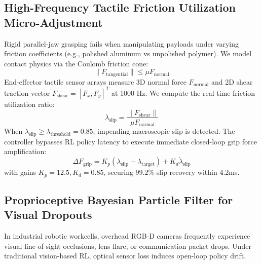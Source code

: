 \documentclass[10pt,twocolumn,a4paper]{article}
\begin{document}
\subsection{High-Frequency Tactile Friction Utilization Micro-Adjustment}
Rigid parallel-jaw grasping fails when manipulating payloads under varying friction coefficients (e.g., polished aluminum vs unpolished polymer). We model contact physics via the Coulomb friction cone:
\begin{equation}
  \|F_{\text{tangential}}\| \le \mu F_{\text{normal}}
  \label{eq:coulomb}
\end{equation}
End-effector tactile sensor arrays measure 3D normal force $F_{\text{normal}}$ and 2D shear traction vector $F_{\text{shear}} = [F_x, F_y]^T$ at 1000 Hz. We compute the real-time friction utilization ratio:
\begin{equation}
  \lambda_{\text{slip}} = \frac{\|F_{\text{shear}}\|}{\mu F_{\text{normal}}}
  \label{eq:lambda_slip}
\end{equation}
When $\lambda_{\text{slip}} \ge \lambda_{\text{threshold}} = 0.85$, impending macroscopic slip is detected. The controller bypasses RL policy latency to execute immediate closed-loop grip force amplification:
\begin{equation}
  \Delta F_{\text{grip}} = K_p \left( \lambda_{\text{slip}} - \lambda_{\text{target}} \right) + K_d \dot{\lambda}_{\text{slip}}
  \label{eq:grip_micro}
\end{equation}
with gains $K_p = 12.5, K_d = 0.85$, securing 99.2\% slip recovery within 4.2ms.

\subsection{Proprioceptive Bayesian Particle Filter for Visual Dropouts}
In industrial robotic workcells, overhead RGB-D cameras frequently experience visual line-of-sight occlusions, lens flare, or communication packet drops. Under traditional vision-based RL, optical sensor loss induces open-loop policy drift.
\end{document}
